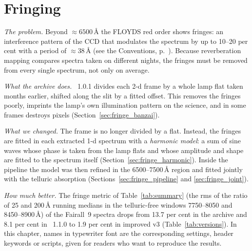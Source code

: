 \chapter{Fringing}
\label{sec:fringe}

\textit{The problem.} Beyond $\approx6500$\,\AA{} the FLOYDS red order shows fringes: an interference pattern of the
CCD that modulates the spectrum by up to 10--20 per cent with a period of $\approx38$\,\AA{}
(see the Conventions, p.~\pageref{sec:conventions}). Because reverberation mapping compares spectra taken on different nights, the
fringes must be removed from every single spectrum, not only on average.

\textit{What the archive does.} \banzai{}~1.0.1 divides each 2-d frame by a whole lamp flat taken months earlier,
shifted along the slit by a fitted offset. This removes the fringes poorly, imprints the lamp's own illumination
pattern on the science, and in some frames destroys pixels (Section~\ref{sec:fringe_banzai}).

\textit{What we changed.} The frame is no longer divided by a flat. Instead, the fringes are fitted in each extracted
1-d spectrum with a \emph{harmonic model}: a sum of sine waves whose phase is taken from the lamp flats and whose
amplitude and shape are fitted to the spectrum itself (Section~\ref{sec:fringe_harmonic}). Inside the pipeline the
model was then refined in the 6500--7500\,\AA{} region and fitted jointly with the telluric absorption
(Sections~\ref{sec:fringe_pipeline} and \ref{sec:fringe_joint}).

\textit{How much better.} The fringe metric of Table~\ref{tab:summary} (the rms of the ratio of 25 and 200\,\AA{}
running medians in the telluric-free windows 7750--8050 and 8450--8900\,\AA) of the Fairall~9 spectra drops from 13.7
per cent in the archive and 8.1 per cent in \banzai{}~1.1.0 to 1.9 per cent in improved v3
(Table~\ref{tab:versions}). In this chapter, names in typewriter font are the corresponding \banzai{} settings,
header keywords or scripts, given for readers who want to reproduce the results.

